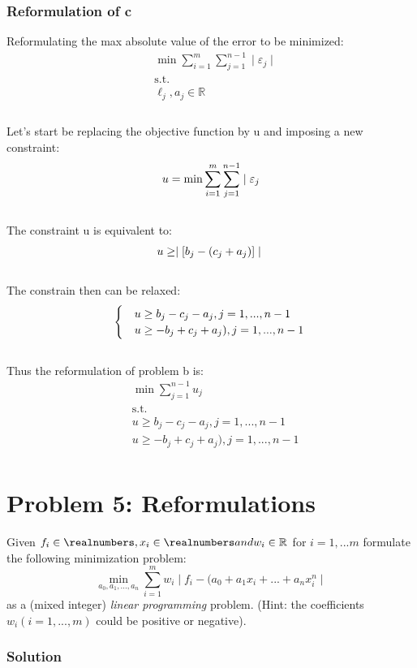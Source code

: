 \documentclass[12pt]{article}
\begin{document}
\subsubsection{Reformulation of c}
Reformulating the max absolute value of the error to be minimized: 
    \begin{align*}
            &\min \sum_{i=1}^{m}\sum_{j=1}^{n-1} \mid \varepsilon_j \mid\\
            &\text{s.t.}\\
            &\ell_j, a_j \in \mathbb{R} \\
    \end{align*}\\
Let's start be replacing the objective function by u and imposing a new constraint:\\
    \begin{equation*}
        u = \min \sum_{i=1}^{m}\sum_{j=1}^{n-1} \mid \varepsilon_j\\
    \end{equation*}\\
The constraint u is equivalent to:\\
    \begin{equation*}
        u \geq \mid [b_j-(c_j + a_j)]\mid\\
    \end{equation*}\\
The constrain then can be relaxed:\\
   \begin{equation*}
        \begin{cases}
            &u \geq b_j - c_j - a_j  , j = 1,...,n-1\\
            &u \geq -b_j + c_j + a_j), j = 1,...,n-1\\
        \end{cases}\\
    \end{equation*}\\
Thus the reformulation of problem b is: 
    \begin{align*}
        &\min \sum_{j=1}^{n-1} u_j\\
        &\text{s.t.}\\
        &u \geq b_j - c_j - a_j  , j = 1,...,n-1\\
        &u \geq -b_j + c_j + a_j), j = 1,...,n-1\\
    \end{align*}



\section{Problem 5: Reformulations}
Given  \( f_i \in \realnumbers, x_i \in \realnumbers and w_i \in \mathbb{R} \) for \( i = 1,...m \) formulate the following minimization problem:\\
\begin{equation*}
    \min_{a_0,a_1,...,a_n} \sum_{i=1}^{m} w_i \mid f_i -  (a_0 + a_1 x_i + ... + a_nx_i^n \mid
\end{equation*}
as a (mixed integer) \textit{linear programming} problem. (Hint: the coefficients \( w_i (i = 1,...,m) \) could be positive or negative).

\subsubsection{Solution}
\end{document}
